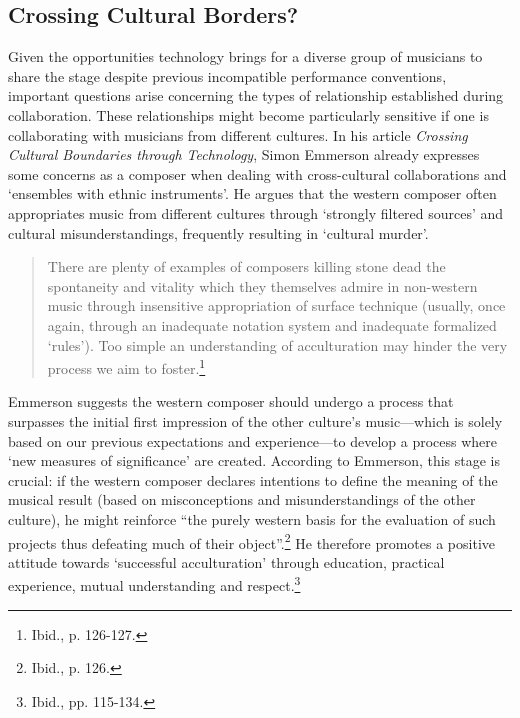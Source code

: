 \subsection{Crossing Cultural Borders?}

Given the opportunities technology brings for a diverse group of musicians to share the stage despite previous incompatible performance conventions, important questions arise concerning the types of relationship established during collaboration. These relationships might become particularly sensitive if one is collaborating with musicians from different cultures. In his article \emph{Crossing Cultural Boundaries through Technology}, Simon Emmerson already expresses some concerns as a composer when dealing with cross-cultural collaborations and `ensembles with ethnic instruments'. He argues that the western composer often appropriates music from different cultures through `strongly filtered sources' and cultural misunderstandings, frequently resulting in `cultural murder'. 
\begin{quote}
There are plenty of examples of composers killing stone dead the spontaneity and vitality which they themselves admire in non-western music through insensitive appropriation of surface technique (usually, once again, through an inadequate notation system and inadequate formalized `rules'). Too simple an understanding of acculturation may hinder the very process we aim to foster.\footnote{Ibid., p. 126-127.} 
\end{quote}

Emmerson suggests the western composer should undergo a process that surpasses the initial first impression of the other culture's music---which is solely based on our previous expectations and experience---to develop a process where `new measures of significance' are created. According to Emmerson, this stage is crucial: if the western composer declares intentions to define the meaning of the musical result (based on misconceptions and misunderstandings of the other culture), he might reinforce ``the purely western basis for the evaluation of such projects thus defeating much of their object''.\footnote{Ibid., p. 126.} He therefore promotes a positive attitude towards `successful acculturation' through education, practical experience, mutual understanding and respect.\footnote{Ibid., pp. 115-134.} 

